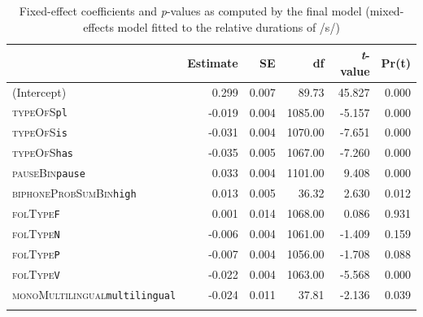 \begin{table}\fontsize{10}{11}
\caption{Fixed-effect coefficients and \textit{p}-values as computed by the final model (mixed-effects model fitted to the relative durations of /s/)}
\label{tab:4.10}
\centering
\begin{tabular}{lrrrrr} 
\lsptoprule
~                            & Estimate & SE    & df      & \textit{t}-value & Pr(\textbar{}t\textbar{})  \\ 
\midrule
(Intercept)                  & 0.299    & 0.007 & 89.73   & 45.827           & 0.000                      \\
\textsc{typeOfS}\texttt{pl}                    & -0.019   & 0.004 & 1085.00 & -5.157           & 0.000                      \\
\textsc{typeOfS}\texttt{is}                    & -0.031   & 0.004 & 1070.00 & -7.651           & 0.000                      \\
\textsc{typeOfS}\texttt{has}                   & -0.035   & 0.005 & 1067.00 & -7.260           & 0.000                      \\
\textsc{pauseBin}\texttt{pause}                & 0.033    & 0.004 & 1101.00 & 9.408            & 0.000                      \\
\textsc{biphoneProbSumBin}\texttt{high}        & 0.013    & 0.005 & 36.32   & 2.630            & 0.012                      \\
\textsc{folType}\texttt{F}                     & 0.001    & 0.014 & 1068.00 & 0.086            & 0.931                      \\
\textsc{folType}\texttt{N}                     & -0.006   & 0.004 & 1061.00 & -1.409           & 0.159                      \\
\textsc{folType}\texttt{P}                     & -0.007   & 0.004 & 1056.00 & -1.708           & 0.088                      \\
\textsc{folType}\texttt{V}                     & -0.022   & 0.004 & 1063.00 & -5.568           & 0.000                      \\
\textsc{monoMultilingual}\texttt{multilingual} & -0.024   & 0.011 & 37.81   & -2.136           & 0.039                      \\
\lspbottomrule
\end{tabular}
\end{table}




